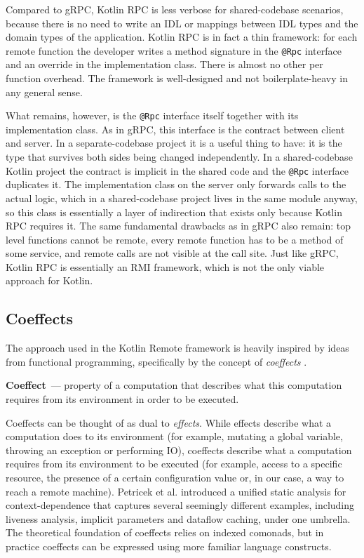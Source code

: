 \documentclass[a4paper,11pt,oneside]{article}
\newcommand{\term}[1]{\textit{#1}}
\newcommand{\makedefinition}[3][]{\textbf{#2}\ifthenelse{\equal{#1}{}}{}{~(#1)}~--- #3.}
\newcommand{\kotlini}[1]{\texttt{#1}}
\begin{document}
Compared to gRPC, Kotlin RPC is less verbose for shared-codebase scenarios, because there is no
need to write an IDL or mappings between IDL types and the domain types of the application. Kotlin RPC
is in fact a thin framework: for each remote function the developer writes a method signature in the
\kotlini{@Rpc} interface and an override in the implementation class. There is almost no other per
function overhead. The framework is well-designed and not boilerplate-heavy in any general sense.

What remains, however, is the \kotlini{@Rpc} interface itself together with its implementation
class. As in gRPC, this interface is the contract between client and server. In a separate-codebase
project it is a useful thing to have: it is the type that survives both sides being changed
independently. In a shared-codebase Kotlin project the contract is implicit in the shared code and
the \kotlini{@Rpc} interface duplicates it. The implementation class on the server only forwards calls
to the actual logic, which in a shared-codebase project lives in the same module anyway, so this
class is essentially a layer of indirection that exists only because Kotlin RPC requires it. The
same fundamental drawbacks as in gRPC also remain: top level functions cannot be remote, every
remote function has to be a method of some service, and remote calls are not visible at the call
site. Just like gRPC, Kotlin RPC is essentially an RMI framework, which is not the only viable
approach for Kotlin.

\subsection{Coeffects}\label{coeffects-section}

The approach used in the Kotlin Remote framework is heavily inspired by ideas from
functional programming, specifically by the concept of \term{coeffects}
\cite{petricek_coeffects_2013}\cite{noauthor_coeffects_nodate}.

\makedefinition{Coeffect}{property of a computation that describes what this computation requires
from its environment in order to be executed}

Coeffects can be thought of as dual to \term{effects}. While effects describe what a computation
does to its environment (for example, mutating a global variable, throwing an exception or
performing IO), coeffects describe what a computation requires from its environment to be executed
(for example, access to a specific resource, the presence of a certain configuration value or, in our case,
a way to reach a remote machine). Petricek et al. \cite{petricek_coeffects_2013} introduced a unified
static analysis for context-dependence that captures several seemingly different examples, including
liveness analysis, implicit parameters and dataflow caching, under one umbrella. The theoretical
foundation of coeffects relies on indexed comonads, but in practice coeffects can be expressed
using more familiar language constructs.
\end{document}
